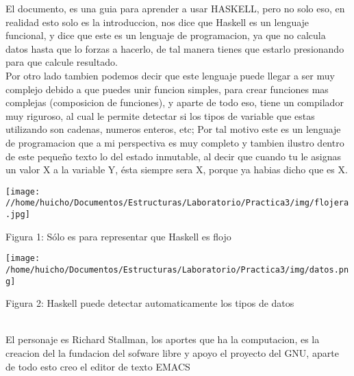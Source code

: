\documentclass{report}%
\begin{document}
{\normalsize
El documento, es una guia para aprender a usar HASKELL, pero no solo eso, en realidad esto solo es la introduccion, nos dice que Haskell es un lenguaje funcional, y dice que este es un lenguaje de programacion, ya que no calcula datos hasta que lo forzas a hacerlo, de tal manera tienes que estarlo presionando para que calcule resultado.\\
Por otro lado tambien podemos decir que este lenguaje puede llegar a ser muy complejo debido a que puedes unir funcion simples, para crear funciones mas complejas (composicion de funciones), y aparte de todo eso, tiene un compilador muy riguroso, al cual le permite detectar si los tipos de variable que estas utilizando son cadenas, numeros enteros, etc; Por tal motivo este es un lenguaje de programacion que a mi perspectiva es muy completo y tambien ilustro dentro de este pequeño texto lo del estado inmutable, al decir que cuando tu le asignas un valor X a la variable Y, ésta siempre sera X, porque ya habias dicho que es X.
}\\

\begin{minipage}[b]{0.4\textwidth}

                        \begin{center}
                        \texttt{[image: //home/huicho/Documentos/Estructuras/Laboratorio/Practica3/img/flojera.jpg]}
                       \end{center}
                       \caption{{\small Figura 1: Sólo es para representar que Haskell es flojo}}
                        
                      
\end{minipage}\hfill \begin{minipage}[b]{0.4\textwidth}
                        \begin{center}
                        
                        \texttt{[image: /home/huicho/Documentos/Estructuras/Laboratorio/Practica3/img/datos.png]}

                        \end{center}
                        \caption{{\small Figura 2: Haskell puede detectar automaticamente los tipos de datos}}


                        \end{minipage}

\\
{\small El personaje es Richard Stallman, los aportes que ha la computacion, es la creacion del la fundacion del sofware libre y apoyo el proyecto del GNU, aparte de todo esto creo el editor de texto EMACS}
\end{document}
